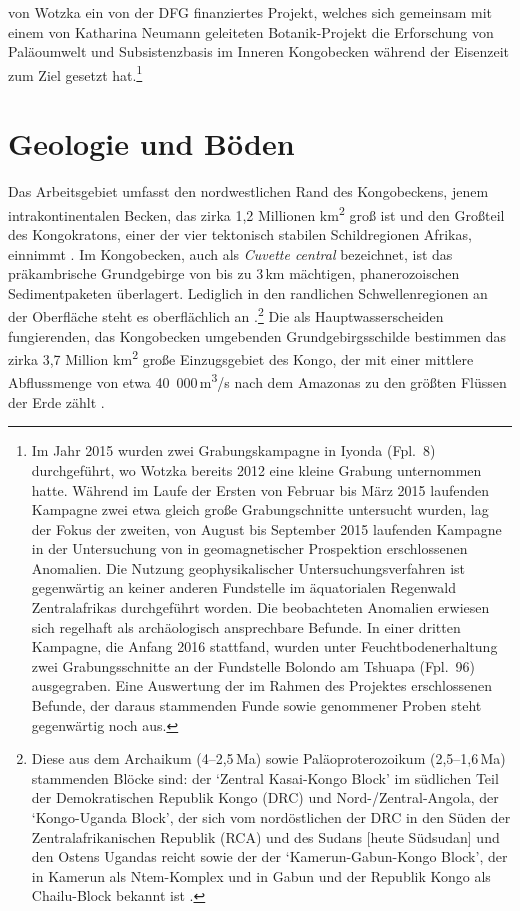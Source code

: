 von Wotzka ein von der DFG finanziertes Projekt, welches sich gemeinsam mit einem von Katharina Neumann geleiteten Botanik-Projekt die Erforschung von Paläoumwelt und Subsistenzbasis im Inneren Kongobecken während der Eisenzeit zum Ziel gesetzt hat.\footnote{Im Jahr 2015 wurden zwei Grabungskampagne in Iyonda (Fpl.~8) durchgeführt, wo Wotzka bereits 2012 eine kleine Grabung unternommen hatte. Während im Laufe der Ersten von Februar bis März 2015 laufenden Kampagne zwei etwa gleich große Grabungschnitte untersucht wurden, lag der Fokus der zweiten, von August bis September 2015 laufenden Kampagne in der Untersuchung von in geomagnetischer Prospektion erschlossenen Anomalien. Die Nutzung geophysikalischer Untersuchungsverfahren ist gegenwärtig an keiner anderen Fundstelle im äquatorialen Regenwald Zentralafrikas durchgeführt worden. Die beobachteten Anomalien erwiesen sich regelhaft als archäologisch ansprechbare Befunde. In einer dritten Kampagne, die Anfang 2016 stattfand, wurden unter Feuchtbodenerhaltung zwei Grabungsschnitte an der Fundstelle Bolondo am Tshuapa (Fpl.~96) ausgegraben. Eine Auswertung der im Rahmen des Projektes erschlossenen Befunde, der daraus stammenden Funde sowie genommener Proben steht gegenwärtig noch aus.}

%




\section{Geologie und Böden}

Das Arbeitsgebiet umfasst den nordwestlichen Rand des Kongobeckens, jenem intrakontinentalen Becken, das zirka 1,2 Millionen km\textsuperscript{2} groß ist und den Großteil des Kongokratons, einer der vier tektonisch stabilen Schildregionen Afrikas, einnimmt \parencites[16]{Runge.2001}[240]{KadimaKabongo.2011}. Im Kongobecken, auch als \textit{Cuvette central} bezeichnet, ist das präkambrische Grundgebirge von bis zu 3\,km mächtigen, phanerozoischen Sedimentpaketen überlagert. Lediglich in den randlichen Schwellenregionen an der Oberfläche steht es oberflächlich an \parencite[17]{Runge.2001}.\footnote{Diese aus dem Archaikum (4--2,5\,Ma) sowie Paläoproterozoikum (2,5--1,6\,Ma) stammenden Blöcke sind: der \enquote*{Zentral Kasai-Kongo Block} im südlichen Teil der Demokratischen Republik Kongo (DRC) und Nord-/Zentral-Angola, der \enquote*{Kongo-Uganda Block}, der sich vom nordöstlichen der DRC in den Süden der Zentralafrikanischen Republik (RCA) und des Sudans [heute Südsudan] und den Ostens Ugandas reicht sowie der der \enquote*{Kamerun-Gabun-Kongo Block}, der in Kamerun als Ntem-Komplex und in Gabun und der Republik Kongo als Chailu-Block bekannt ist \parencite[240]{KadimaKabongo.2011}.} Die als Hauptwasserscheiden fungierenden, das Kongobecken umgebenden Grundgebirgsschilde bestimmen das zirka 3,7 Million km\textsuperscript{2} große Einzugsgebiet des Kongo, der mit einer mittlere Abflussmenge von etwa 40~000\,m\textsuperscript{3}/s nach dem Amazonas zu den größten Flüssen der Erde zählt \parencite[63]{Runge.2001}.

